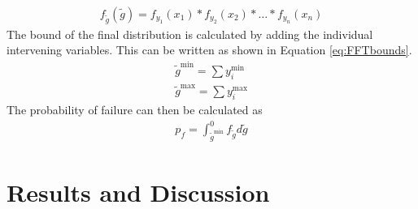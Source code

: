 \documentclass[paper=a4, fontsize=12pt]{scrartcl} %
\begin{document}
%
\begin{gather}\label{eq:convolutionPDFs}
	f_{\tilde{g}} \left( \tilde{g} \right) = f_{y_1} \left( x_1 \right) * f_{y_2}
		\left( x_2 \right) * \dots * f_{y_n} \left( x_n \right)
\end{gather}
%
The bound of the final distribution is calculated by adding the individual intervening variables. This can be written as shown in Equation \eqref{eq:FFTbounds}.
%
\begin{subequations}\label{eq:FFTbounds}
\begin{align}
	\tilde{g}^{\text{min}} = \sum y_i^{\text{min}}
	\\
	\tilde{g}^{\text{max}} = \sum y_i^{\text{max}}
\end{align}
\end{subequations}
%
The probability of failure can then be calculated as
%
\begin{gather}
	p_f = \int_{\tilde{g}^{\text{min}}}^0 f_{\tilde{g}} d\tilde{g}
\end{gather}
%
\section{Results and Discussion}
\end{document}
